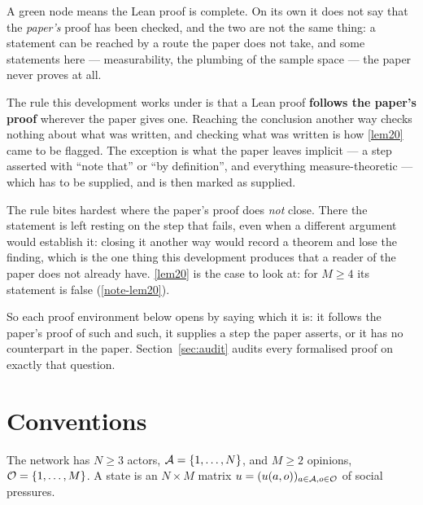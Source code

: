 \begin{remark}
  \label{note-green}
  A green node means the Lean proof is complete.  On its own it does not say
  that the \emph{paper's} proof has been checked, and the two are not the same
  thing: a statement can be reached by a route the paper does not take, and
  some statements here --- measurability, the plumbing of the sample space ---
  the paper never proves at all.

  The rule this development works under is that a Lean proof \textbf{follows
  the paper's proof} wherever the paper gives one.  Reaching the conclusion
  another way checks nothing about what was written, and checking what was
  written is how \ref{lem20} came to be flagged.  The exception
  is what the paper leaves implicit --- a step asserted with ``note that'' or
  ``by definition'', and everything measure-theoretic --- which has to be
  supplied, and is then marked as supplied.

  The rule bites hardest where the paper's proof does \emph{not} close.  There
  the statement is left resting on the step that fails, even when a different
  argument would establish it: closing it another way would record a theorem and
  lose the finding, which is the one thing this development produces that a
  reader of the paper does not already have.  \ref{lem20} is the case to look
  at: for $M \ge 4$ its statement is false (\ref{note-lem20}).

  So each proof environment below opens by saying which it is: it follows the
  paper's proof of such and such, it supplies a step the paper asserts, or it
  has no counterpart in the paper.
  Section~\ref{sec:audit} audits every formalised proof on exactly that
  question.
\end{remark}

\section{Conventions}

The network has $N \ge 3$ actors, $\mathcal{A} = \{1, \dots, N\}$, and $M \ge 2$
opinions, $\mathcal{O} = \{1, \dots, M\}$.  A state is an $N \times M$ matrix
$u = (u(a,o))_{a \in \mathcal{A}, o \in \mathcal{O}}$ of social pressures.

